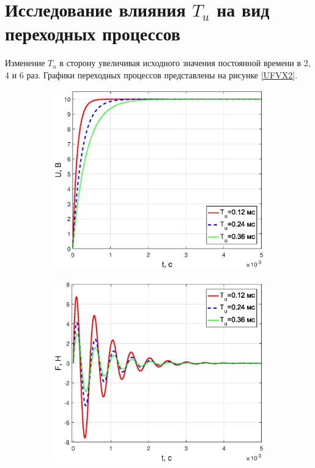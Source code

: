 \documentclass[12pt,a4paper]{article}
\begin{document}
\section{Исследование влияния $T_u$ на вид переходных процессов}
Изменение $T_u$ в сторону увеличивая исходного значения постоянной времени в 2, 4 и 6 раз. Графики переходных процессов представлены на рисунке \ref{UFVX2}.
\begin{figure}[H]
	\centering
	\begin{subfigure}[b]{0.48\textwidth}
	    \includegraphics[width = \textwidth]{U2}
	\end{subfigure}
	\hfill
	\begin{subfigure}[b]{0.48\textwidth}
		\includegraphics[width = \textwidth]{F2}

\end{subfigure}
\end{figure}
\end{document}
